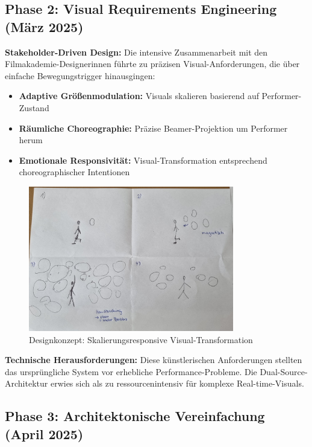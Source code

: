 \subsection{Phase 2: Visual Requirements Engineering (März 2025)}

\textbf{Stakeholder-Driven Design:}
Die intensive Zusammenarbeit mit den Filmakademie-Designerinnen führte zu präzisen Visual-Anforderungen, die über einfache Bewegungstrigger hinausgingen:

\begin{itemize}
    \item \textbf{Adaptive Größenmodulation:} Visuals skalieren basierend auf Performer-Zustand
    \item \textbf{Räumliche Choreographie:} Präzise Beamer-Projektion um Performer herum
    \item \textbf{Emotionale Responsivität:} Visual-Transformation entsprechend choreographischer Intentionen
\end{itemize}

\begin{figure}[H]
    \centering
    \includegraphics[width=0.8\textwidth]{images/Sprint3_1.jpg}
    \caption{Designkonzept: Skalierungsresponsive Visual-Transformation}
    \label{fig:design_evolution}
\end{figure}

\textbf{Technische Herausforderungen:}
Diese künstlerischen Anforderungen stellten das ursprüngliche System vor erhebliche Performance-Probleme. Die Dual-Source-Architektur erwies sich als zu ressourcenintensiv für komplexe Real-time-Visuals.

\newpage

\subsection{Phase 3: Architektonische Vereinfachung (April 2025)}

